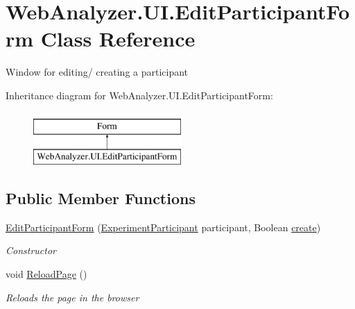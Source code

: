 \hypertarget{class_web_analyzer_1_1_u_i_1_1_edit_participant_form}{}\section{Web\+Analyzer.\+U\+I.\+Edit\+Participant\+Form Class Reference}
\label{class_web_analyzer_1_1_u_i_1_1_edit_participant_form}


Window for editing/ creating a participant  


Inheritance diagram for Web\+Analyzer.\+U\+I.\+Edit\+Participant\+Form\+:\begin{figure}[H]
\begin{center}
\leavevmode
\includegraphics[height=2.000000cm]{class_web_analyzer_1_1_u_i_1_1_edit_participant_form}
\end{center}
\end{figure}
\subsection*{Public Member Functions}
\begin{DoxyCompactItemize}
\item 
\hyperlink{class_web_analyzer_1_1_u_i_1_1_edit_participant_form_a5b988532c5dfa542239ee3ba825193d6}{Edit\+Participant\+Form} (\hyperlink{class_web_analyzer_1_1_models_1_1_base_1_1_experiment_participant}{Experiment\+Participant} participant, Boolean \hyperlink{_u_i_2_h_t_m_l_resources_2js_2lib_2underscore_8min_8js_a8bd5981157799459d39a59e8c4a0de04}{create})
\begin{DoxyCompactList}\small\item\em Constructor \end{DoxyCompactList}\item 
void \hyperlink{class_web_analyzer_1_1_u_i_1_1_edit_participant_form_a80f4335016a704ef46b291fa92f1a7d4}{Reload\+Page} ()
\begin{DoxyCompactList}\small\item\em Reloads the page in the browser \end{DoxyCompactList}\end{DoxyCompactItemize}
